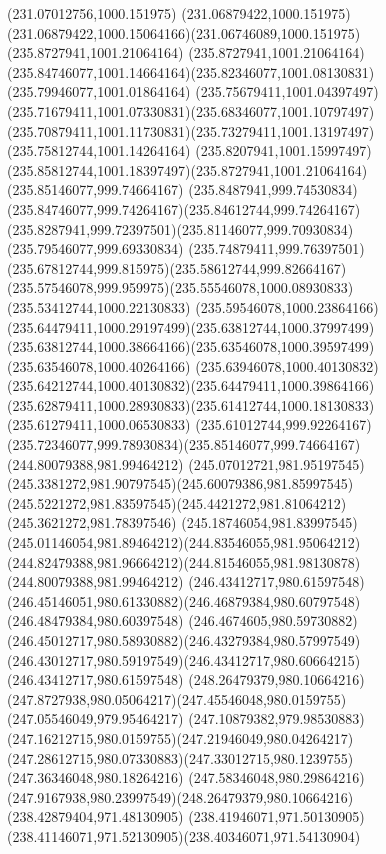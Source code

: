 {{\lineto(231.07012756,1000.151975)
\curveto(231.06879422,1000.151975)(231.06879422,1000.15064166)(231.06746089,1000.151975)
\moveto(235.8727941,1001.21064164)
\lineto(235.8727941,1001.21064164)
\curveto(235.84746077,1001.14664164)(235.82346077,1001.08130831)(235.79946077,1001.01864164)
\curveto(235.75679411,1001.04397497)(235.71679411,1001.07330831)(235.68346077,1001.10797497)
\curveto(235.70879411,1001.11730831)(235.73279411,1001.13197497)(235.75812744,1001.14264164)
\curveto(235.8207941,1001.15997497)(235.85812744,1001.18397497)(235.8727941,1001.21064164)
\moveto(235.85146077,999.74664167)
\curveto(235.8487941,999.74530834)(235.84746077,999.74264167)(235.84612744,999.74264167)
\curveto(235.8287941,999.72397501)(235.81146077,999.70930834)(235.79546077,999.69330834)
\curveto(235.74879411,999.76397501)(235.67812744,999.815975)(235.58612744,999.82664167)
\curveto(235.57546078,999.959975)(235.55546078,1000.08930833)(235.53412744,1000.22130833)
\curveto(235.59546078,1000.23864166)(235.64479411,1000.29197499)(235.63812744,1000.37997499)
\curveto(235.63812744,1000.38664166)(235.63546078,1000.39597499)(235.63546078,1000.40264166)
\curveto(235.63946078,1000.40130832)(235.64212744,1000.40130832)(235.64479411,1000.39864166)
\curveto(235.62879411,1000.28930833)(235.61412744,1000.18130833)(235.61279411,1000.06530833)
\curveto(235.61012744,999.92264167)(235.72346077,999.78930834)(235.85146077,999.74664167)
\moveto(244.80079388,981.99464212)
\curveto(245.07012721,981.95197545)(245.3381272,981.90797545)(245.60079386,981.85997545)
\curveto(245.5221272,981.83597545)(245.4421272,981.81064212)(245.3621272,981.78397546)
\curveto(245.18746054,981.83997545)(245.01146054,981.89464212)(244.83546055,981.95064212)
\curveto(244.82479388,981.96664212)(244.81546055,981.98130878)(244.80079388,981.99464212)
\moveto(246.43412717,980.61597548)
\curveto(246.45146051,980.61330882)(246.46879384,980.60797548)(246.48479384,980.60397548)
\curveto(246.4674605,980.59730882)(246.45012717,980.58930882)(246.43279384,980.57997549)
\curveto(246.43012717,980.59197549)(246.43412717,980.60664215)(246.43412717,980.61597548)
\moveto(248.26479379,980.10664216)
\curveto(247.8727938,980.05064217)(247.45546048,980.0159755)(247.05546049,979.95464217)
\curveto(247.10879382,979.98530883)(247.16212715,980.0159755)(247.21946049,980.04264217)
\curveto(247.28612715,980.07330883)(247.33012715,980.1239755)(247.36346048,980.18264216)
\curveto(247.58346048,980.29864216)(247.9167938,980.23997549)(248.26479379,980.10664216)
\moveto(238.42879404,971.48130905)
\curveto(238.41946071,971.50130905)(238.41146071,971.52130905)(238.40346071,971.54130904)
}}
